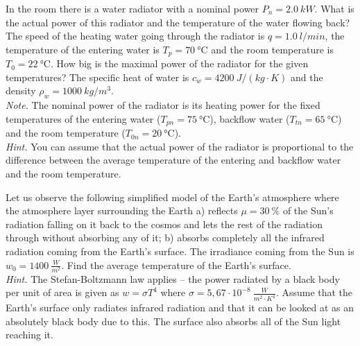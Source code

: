 \documentclass[11pt]{article}
\begin{document}
\probeng
In the room there is a water radiator with a nominal power $P_{n}=\SI{2.0}{kW}$. What is the actual power of this radiator and the temperature of the water flowing back? The speed of the heating water going through the radiator is $q=\SI{1.0}{l/min}$, the temperature of the entering water is $T_{p}=\SI{70}{\degreeCelsius}$ and the room temperature is $T_{0}=\SI{22}{\degreeCelsius}$.  How big is the maximal power of the radiator for the given temperatures? The specific heat of water is $c_{w}=\SI{4200}{J/\left(kg\cdot K\right)}$ and the density $\rho_{w}=\SI{1000}{kg/m^{3}}$.\\ 
\emph{Note.} The nominal power of the radiator is its heating power for the fixed temperatures of the entering water ($T_{pn}=\SI{75}{\degreeCelsius}$), backflow water ($T_{tn}=\SI{65}{\degreeCelsius}$) and the room temperature ($T_{0n}=\SI{20}{\degreeCelsius}$).\\
\emph{Hint.} You can assume that the actual power of the radiator is proportional to the difference between the average temperature of the entering and backflow water and the room temperature.
\probend
\bigskip


\probeng
Let us observe the following simplified model of the Earth’s atmosphere where the atmosphere layer surrounding the Earth a) reflects $\mu=\SI{30}{\%}$ of the Sun’s radiation falling on it back to the cosmos and lets the rest of the radiation through without absorbing any of it; b) absorbs completely all the infrared radiation coming from the Earth’s surface. The irradiance coming from the Sun is $w_0=\SI{1400}{\frac{W}{m^2}}$. Find the average temperature of the Earth’s surface.\\
\emph{Hint.} The Stefan-Boltzmann law applies – the power radiated by a black body per unit of area is given as $w=\sigma T^4$ where $\sigma =5,67 \cdot 10^{-8} \SI{}{\frac{W}{m^2 \cdot K^4}}$. Assume that the Earth’s surface only radiates infrared radiation and that it can be looked at as an absolutely black body due to this. The surface also absorbs all of the Sun light reaching it.
\probend
\bigskip

\end{document}
